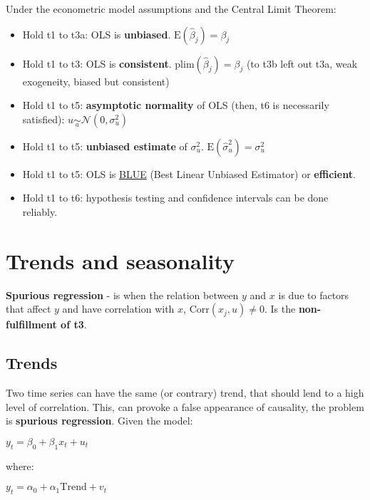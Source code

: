 \documentclass[10pt, a4paper, landscape]{extarticle}
\newcommand{\E}{\mathrm{E}}
\newcommand{\Corr}{\mathrm{Corr}}
\begin{document}
\begin{multicols}{3}
Under the econometric model assumptions and the Central Limit Theorem:

\begin{itemize}[leftmargin=*]
	\item Hold t1 to t3a: OLS is \textbf{unbiased}. $\E(\hat{\beta}_j) = \beta_j$
	\item Hold t1 to t3: OLS is \textbf{consistent}. $\mathrm{plim}(\hat{\beta}_j) = \beta_j$ (to t3b left out t3a, weak exogeneity, biased but consistent)
	\item Hold t1 to t5: \textbf{asymptotic normality} of OLS (then, t6 is necessarily satisfied): $u \underset{a}{\sim} \mathcal{N}(0, \sigma^2_u)$
	\item Hold t1 to t5: \textbf{unbiased estimate} of $\sigma^2_u$. $\E(\hat{\sigma}^2_u) = \sigma^2_u$
	\item Hold t1 to t5: OLS is \textcolor{blue}{\href{https://www.youtube.com/watch?v=68ugkg9RePc}{BLUE}} (Best Linear Unbiased Estimator) or \textbf{efficient}. 
	\item Hold t1 to t6: hypothesis testing and confidence intervals can be done reliably.
\end{itemize}

\columnbreak

\section*{Trends and seasonality}

\textbf{Spurious regression} - is when the relation between $y$ and $x$ is due to factors that affect $y$ and have correlation with $x$, $\Corr(x_j, u) \neq 0$. Is the \textbf{non-fulfillment of t3}.

\subsection*{Trends}

Two time series can have the same (or contrary) trend, that should lend to a high level of correlation. This, can provoke a false appearance of causality, the problem is \textbf{spurious regression}. Given the model:

\begin{center}
	$y_t = \beta_0 + \beta_1 x_t + u_t$
\end{center}

where:

\begin{center}
	$y_t = \alpha_0 + \alpha_1 \mathrm{Trend} + v_t$


\end{center}
\end{multicols}
\end{document}
